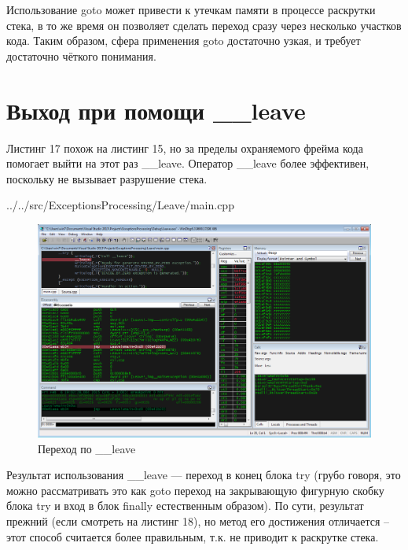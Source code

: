 \documentclass[a4paper, 12pt]{report}		%
\begin{document}


Использование goto может привести к утечкам памяти в процессе раскрутки стека, в то же время он позволяет сделать переход сразу через несколько участков кода. Таким образом, сфера применения goto достаточно узкая, и требует достаточно чёткого понимания.

\chapter*{Выход при помощи \_\_leave}

Листинг 17 похож на листинг 15, но за пределы охраняемого фрейма кода помогает выйти на этот раз \_\_leave. Оператор \_\_leave более эффективен, поскольку не вызывает разрушение стека\cite{Dushutina}.


{../../src/ExceptionsProcessing/Leave/main.cpp}

\begin{figure}[h!]
\centering
\includegraphics[scale=0.50]{res/011}
\caption{Переход по \_\_leave}
\end{figure}



Результат использования \_\_leave — переход в конец блока try (грубо говоря, это можно рассматривать это как goto переход на закрывающую фигурную скобку блока try и вход в блок finally естественным образом). По сути, результат прежний (если смотреть на листинг 18), но метод его достижения отличается -- этот способ считается более правильным, т.к. не приводит к раскрутке стека.
\end{document}
